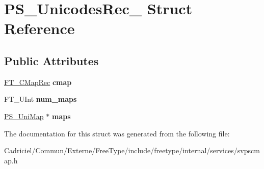 \hypertarget{struct_p_s___unicodes_rec__}{\section{P\-S\-\_\-\-Unicodes\-Rec\-\_\- Struct Reference}
\label{struct_p_s___unicodes_rec__}
}
\subsection*{Public Attributes}
\begin{DoxyCompactItemize}
\item 
\hypertarget{struct_p_s___unicodes_rec___a4c3e28cb86c8a7039107437dcf995da7}{\hyperlink{struct_f_t___c_map_rec__}{F\-T\-\_\-\-C\-Map\-Rec} {\bfseries cmap}}\label{struct_p_s___unicodes_rec___a4c3e28cb86c8a7039107437dcf995da7}

\item 
\hypertarget{struct_p_s___unicodes_rec___abbc3617f13363ddcf851ee229752b08d}{F\-T\-\_\-\-U\-Int {\bfseries num\-\_\-maps}}\label{struct_p_s___unicodes_rec___abbc3617f13363ddcf851ee229752b08d}

\item 
\hypertarget{struct_p_s___unicodes_rec___abd0ff1abe19a2a6a838b631ec81d22cd}{\hyperlink{struct_p_s___uni_map__}{P\-S\-\_\-\-Uni\-Map} $\ast$ {\bfseries maps}}\label{struct_p_s___unicodes_rec___abd0ff1abe19a2a6a838b631ec81d22cd}

\end{DoxyCompactItemize}


The documentation for this struct was generated from the following file\-:\begin{DoxyCompactItemize}
\item 
Cadriciel/\-Commun/\-Externe/\-Free\-Type/include/freetype/internal/services/svpscmap.\-h\end{DoxyCompactItemize}

